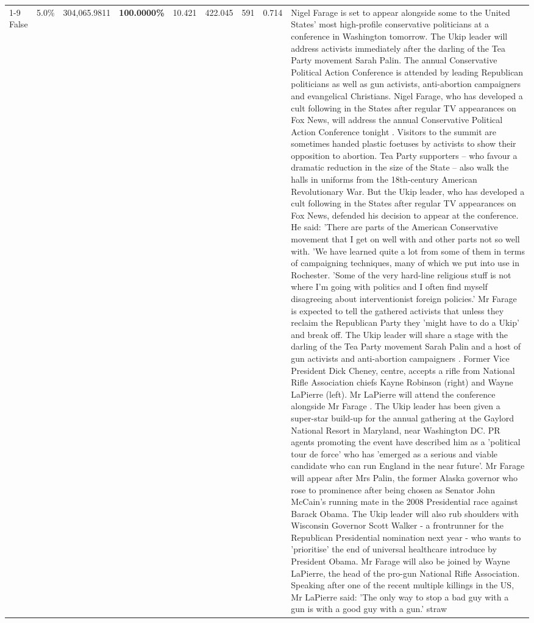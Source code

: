 \begin{table}[H]
\begin{tabular}{lllrlllll}
\cline{1-9}
False & 5.0\% & 304,065.9811 & \bfseries \color{red} 100.0000\% & 10.421 & 422.045 & 591 & 0.714 & Nigel Farage is set to appear alongside some to the United States' most high-profile conservative politicians at a conference in Washington tomorrow. The Ukip leader will address activists immediately after the darling of the Tea Party movement Sarah Palin. The annual Conservative Political Action Conference is attended by leading Republican politicians as well as gun activists, anti-abortion campaigners and evangelical Christians. Nigel Farage, who has developed a cult following in the States after regular TV appearances on Fox News, will address the annual Conservative Political Action Conference tonight . Visitors to the summit are sometimes handed plastic foetuses by activists to show their opposition to abortion. Tea Party supporters – who favour a dramatic reduction in the size of the State – also walk the halls in uniforms from the 18th-century American Revolutionary War. But the Ukip leader, who has developed a cult following in the States after regular TV appearances on Fox News, defended his decision to appear at the conference. He said: 'There are parts of the American Conservative movement that I get on well with and other parts not so well with. 'We have learned quite a lot from some of them in terms of campaigning techniques, many of which we put into use in Rochester. 'Some of the very hard-line religious stuff is not where I'm going with politics and I often find myself disagreeing about interventionist foreign policies.' Mr Farage is expected to tell the gathered activists that unless they reclaim the Republican Party they 'might have to do a Ukip' and break off. The Ukip leader will share a stage with the darling of the Tea Party movement Sarah Palin and a host of gun activists and anti-abortion campaigners . Former Vice President Dick Cheney, centre, accepts a rifle from National Rifle Association chiefs Kayne Robinson (right) and Wayne LaPierre (left). Mr LaPierre will attend the conference alongside Mr Farage . The Ukip leader has been given a super-star build-up for the annual gathering at the Gaylord National Resort in Maryland, near Washington DC. PR agents promoting the event have described him as a 'political tour de force' who has 'emerged as a serious and viable candidate who can run England in the near future'. Mr Farage will appear after Mrs Palin, the former Alaska governor who rose to prominence after being chosen as Senator John McCain's running mate in the 2008 Presidential race against Barack Obama. The Ukip leader will also rub shoulders with Wisconsin Governor Scott Walker - a frontrunner for the Republican Presidential nomination next year - who wants to 'prioritise' the end of universal healthcare introduce by President Obama. Mr Farage will also be joined by Wayne LaPierre, the head of the pro-gun National Rifle Association. Speaking after one of the recent multiple killings in the US, Mr LaPierre said: 'The only way to stop a bad guy with a gun is with a good guy with a gun.' straw \\

\end{tabular}
\end{table}
